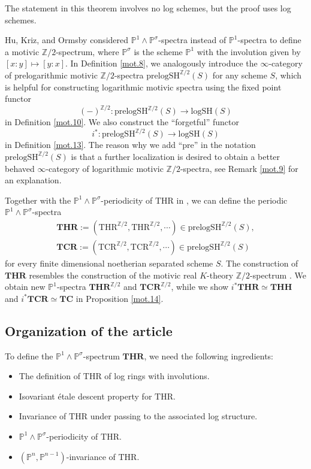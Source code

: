\documentclass[10pt]{amsart}
\theoremstyle{definition}
\theoremstyle{remark}
\numberwithin{equation}{section}
\renewcommand{\P}{\mathbb{P}}
\newcommand{\Z}{\mathbb{Z}}
\newcommand{\logSH}{\mathrm{logSH}}
\newcommand{\THR}{\mathrm{THR}}
\newcommand{\TCR}{\mathrm{TCR}}
\newcommand{\bTHH}{\mathbf{THH}}
\newcommand{\bTCR}{\mathbf{TCR}}
\newcommand{\bTC}{\mathbf{TC}}
\newcommand{\bTHR}{\mathbf{THR}}
\newcommand{\prelogSH}{\mathrm{prelogSH}}
\newcommand{\Ztwo}{{\mathbb{Z}/2}}
\begin{document}
The statement in this theorem involves no log schemes,
but the proof uses log schemes.


\medskip

Hu, Kriz, and Ormsby \cite{HuKO} considered $\P^1\wedge \P^\sigma$-spectra instead of $\P^1$-spectra to define a motivic $\Ztwo$-spectrum,
where $\P^\sigma$ is the scheme $\P^1$ with the involution given by $[x:y]\mapsto [y:x]$.
In Definition \ref{mot.8},
we analogously introduce the $\infty$-category of prelogarithmic motivic $\Ztwo$-spectra $\prelogSH^{\Ztwo}(S)$ for any scheme $S$,
which is helpful for constructing logarithmic motivic spectra using the fixed point functor
\[
(-)^{\Ztwo}
\colon
\prelogSH^{\Ztwo}(S)
\to
\logSH(S)
\]
in Definition \ref{mot.10}.
We also construct the ``forgetful'' functor 
\[
i^*
\colon
\prelogSH^{\Ztwo}(S)
\to
\logSH(S)
\]
in Definition \ref{mot.13}.
The reason why we add ``pre'' in the notation $\prelogSH^{\Ztwo}(S)$ is that a further localization is desired to obtain a better behaved $\infty$-category of logarithmic motivic $\Ztwo$-spectra,
see Remark \ref{mot.9} for an explanation.


\medskip

Together with the $\P^1\wedge \P^\sigma$-periodicity of $\THR$ in \cite[Proposition 5.1.5]{THR},
we can define the periodic  $\P^1\wedge \P^\sigma$-spectra
\begin{gather*}
\bTHR
:=
(\THR^{\Z/2},\THR^{\Z/2},\cdots)
\in
\prelogSH^{\Ztwo}(S),
\\
\bTCR
:=
(\TCR^{\Z/2},\TCR^{\Z/2},\cdots)
\in
\prelogSH^{\Ztwo}(S)
\end{gather*}
for every finite dimensional noetherian separated scheme $S$.
The construction of $\bTHR$ resembles the construction of the motivic real $K$-theory $\Ztwo$-spectrum \cite[\S 4.3]{HuKO}.
We obtain new $\P^1$-spectra $\bTHR^{\Ztwo}$ and $\bTCR^{\Ztwo}$,
while we show $i^*\bTHR\simeq \bTHH$ and $i^*\bTCR\simeq \bTC$ in Proposition \ref{mot.14}.


\subsection*{Organization of the article}

To define the $\P^1\wedge \P^\sigma$-spectrum $\bTHR$,
we need the following ingredients:

\begin{itemize}
\item[(1)]
The definition of $\THR$ of log rings with involutions.
\item[(2)]
Isovariant \'etale descent property for $\THR$.
\item[(3)]
Invariance of $\THR$ under passing to the associated log structure.
\item[(4)]
$\P^1\wedge \P^\sigma$-periodicity of $\THR$.
\item[(5)]
$(\P^n,\P^{n-1})$-invariance of $\THR$.
\end{itemize}
\end{document}
